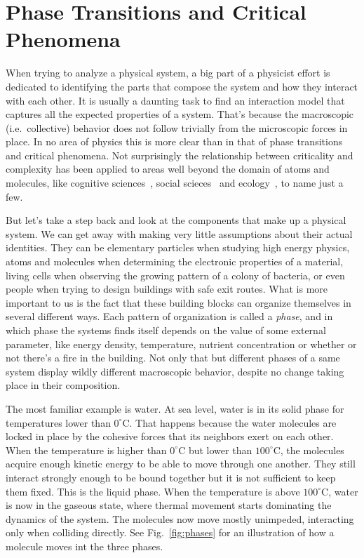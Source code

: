 \chapter{Phase Transitions and Critical Phenomena}
\label{ch:crit}

When trying to analyze a physical system, a big part of a physicist effort is
dedicated to identifying the parts that compose the system and how they
interact with each other. It is usually a daunting task to find an interaction
model that captures all the expected properties of a system. That's because the
macroscopic (i.e.\ collective) behavior does not follow trivially from the
microscopic forces in place. In no area of physics this is more clear than in
that of phase transitions and critical phenomena. Not surprisingly the
relationship between criticality and complexity has been applied to areas well
beyond the domain of atoms and molecules, like cognitive
sciences~\cite{Kello2010}, social scieces~\cite{Kron2009} and
ecology~\cite{Sole1999}, to name just a few.

But let's take a step back and look at the components that make up a physical
system. We can get away with making very little assumptions about their actual
identities. They can be elementary particles when studying high energy physics,
atoms and molecules when determining the electronic properties of a material,
living cells when observing the growing pattern of a colony of bacteria, or
even people when trying to design buildings with safe exit routes. What is more
important to us is the fact that these building blocks can organize themselves
in several different ways. Each pattern of organization is called a
\textit{phase}, and in which phase the systems finds itself depends on the
value of some external parameter, like energy density, temperature, nutrient
concentration or whether or not there's a fire in the building. Not only that
but different phases of a same system display wildly different macroscopic
behavior, despite no change taking place in their composition.

The most familiar example is water. At sea level, water is in its solid phase
for temperatures lower than $0^\circ$C. That happens because the water
molecules are locked in place by the cohesive forces that its neighbors exert
on each other. When the temperature is higher than $0^\circ$C but lower than
$100^\circ$C, the molecules acquire enough kinetic energy to be able to move
through one another. They still interact strongly enough to be bound together
but it is not sufficient to keep them fixed. This is the liquid phase. When the
temperature is above $100^\circ$C, water is now in the gaseous state, where
thermal movement starts dominating the dynamics of the system. The molecules
now move mostly unimpeded, interacting only when colliding directly. See
Fig.~\ref{fig:phases} for an illustration of how a molecule moves int the three
phases.

